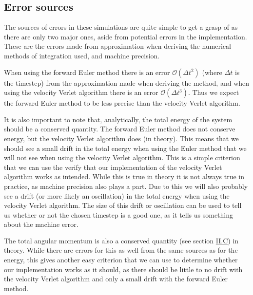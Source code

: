 \documentclass[reprint,english,notitlepage]{revtex4-1}  %
\begin{document}
\subsection{Error sources} \label{sec:III:c}

The sources of errors in these simulations are quite simple to get a grasp of as there are only two major ones, aside from potential errors in the implementation. These are the errors made from approximation when deriving the numerical methods of integration used, and machine precision. 

When using the forward Euler method there is an error $\mathcal{O}(\Delta t^2)$ (where $\Delta t$ is the timestep) from the approximation made when deriving the method, and when using the velocity Verlet algorithm there is an error $\mathcal{O}(\Delta t^3)$. Thus we expect the forward Euler method to be less precise than the velocity Verlet algorithm. 

It is also important to note that, analytically, the total energy of the system should be a conserved quantity. The forward Euler method does not conserve energy, but the velocity Verlet algorithm does (in theory). This means that we should see a small drift in the total energy when using the Euler method that we will not see when using the velocity Verlet algorithm. This is a simple criterion that we can use the verify that our implementation of the velocity Verlet algorithm works as intended. While this is true in theory it is not always true in practice, as machine precision also plays a part. Due to this we will also probably see a drift (or more likely an oscillation) in the total energy when using the velocity Verlet algorithm. The size of this drift or oscillation can be used to tell us whether or not the chosen timestep is a good one, as it tells us something about the machine error. 

The total angular momentum is also a conserved quantity (see section \hyperref[sec:II:c]{II.C}) in theory. While there are errors for this as well from the same sources as for the energy, this gives another easy criterion that we can use to determine whether our implementation works as it should, as there should be little to no drift with the velocity Verlet algorithm and only a small drift with the forward Euler method.  
\end{document}

